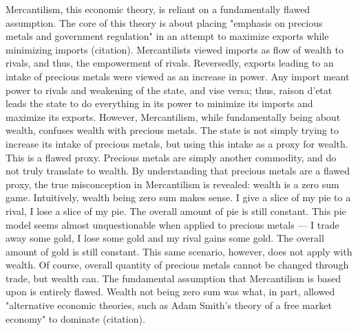 \documentclass[letterpaper]{article}
\begin{document}
Mercantilism, this economic theory, is reliant on a fundamentally flawed
assumption. The core of this theory is about placing "emphasis on
precious metals and government regulation" in an attempt to maximize
exports while minimizing imports (citation). Mercantilists viewed
imports as flow of wealth to rivals, and thus, the empowerment of
rivals. Reversedly, exports leading to an intake of precious metals were
viewed as an increase in power. Any import meant power to rivals and
weakening of the state, and vise versa; thus, raison d'etat leads the
state to do everything in its power to minimize its imports and maximize
its exports. However, Mercantilism, while fundamentally being about
wealth, confuses wealth with precious metals. The state is not simply
trying to increase its intake of precious metals, but using this intake
as a proxy for wealth. This is a flawed proxy. Precious metals are
simply another commodity, and do not truly translate to wealth. By
understanding that precious metals are a flawed proxy, the true
misconception in Mercantilism is revealed: wealth is a zero sum game.
Intuitively, wealth being zero sum makes sense. I give a slice of my pie
to a rival, I lose a slice of my pie. The overall amount of pie is still
constant. This pie model seems almost unquestionable when applied to
precious metals --- I trade away some gold, I lose some gold and my
rival gains some gold. The overall amount of gold is still constant.
This same scenario, however, does not apply with wealth. Of course,
overall quantity of precious metals cannot be changed through trade, but
wealth can. The fundamental assumption that Mercantilism is based upon
is entirely flawed. Wealth not being zero sum was what, in part, allowed
"alternative economic theories, such as Adam Smith's theory of a free
market economy" to dominate (citation).
\end{document}
